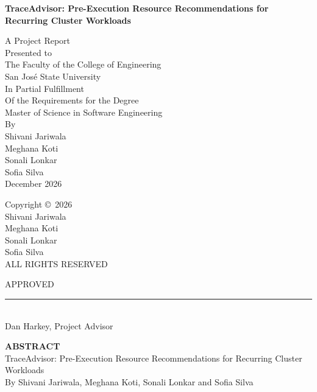 \documentclass{IEEEtran}
\begin{document}
\onecolumn
{}
\thispagestyle{empty}
\begin{center}
\vspace*{1in}
{\LARGE\bfseries TraceAdvisor: Pre-Execution Resource Recommendations for Recurring Cluster Workloads\par}
\vspace{1in}
A Project Report\\[0.5em]
Presented to\\
The Faculty of the College of Engineering\\[1em]
San Jos\'{e} State University\\[1em]
In Partial Fulfillment\\
Of the Requirements for the Degree\\
Master of Science in Software Engineering\\[1in]
By\\[0.5em]
Shivani Jariwala\\Meghana Koti\\Sonali Lonkar\\Sofia Silva\\[1in]
December 2026
\end{center}
\newpage
\thispagestyle{empty}
\vspace*{\fill}
\begin{center}
Copyright \copyright\ 2026\\[1em]
Shivani Jariwala\\Meghana Koti\\Sonali Lonkar\\Sofia Silva\\[1em]
ALL RIGHTS RESERVED
\end{center}
\vspace*{\fill}
\newpage
\begin{center}
\vspace*{2in}
{\large APPROVED}\\[1.5in]
\rule{3in}{0.4pt}\\
Dan Harkey, Project Advisor
\end{center}
\newpage
\begin{center}
{\large\bfseries ABSTRACT}\\[1em]
TraceAdvisor: Pre-Execution Resource Recommendations for Recurring Cluster Workloads\\[0.5em]
By Shivani Jariwala, Meghana Koti, Sonali Lonkar and Sofia Silva
\end{center}
\vspace{1em}
\end{document}
